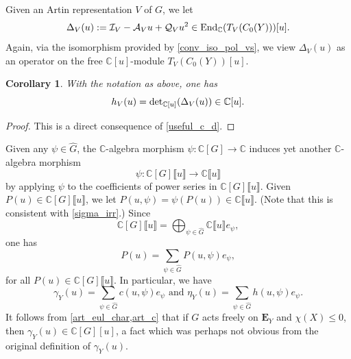 \documentclass[11pt]{amsart}
\newtheorem{corollary}[theorem]{Corollary}
\numberwithin{equation}{section}
\theoremstyle{remark}
\theoremstyle{definition}
\newtheorem{example}[theorem]{Example}
\begin{document}
Given an Artin representation $V$ of $G$, we let
$$\Delta_{V}(u) := \mathcal{I}_{V} - \mathcal{A}_{V}u + \mathcal{Q}_{V}u^{2} \in {\rm End}_{\mathbb{C}}(T_{V}(C_{0}(Y)))[u]. $$
Again, via the isomorphism provided by \cref{conv_iso_pol_vs}, we view $\Delta_{V}(u)$ as an operator on the free $\mathbb{C}[u]$-module $T_{V}(C_{0}(Y))[u]$.
\begin{corollary} \label{3_term}
With the notation as above, one has
$$h_{V}(u) = {\rm det}_{\mathbb{C}[u]}(\Delta_{V}(u)) \in \mathbb{C}[u]. $$
\end{corollary}
\begin{proof}
This is a direct consequence of \cref{useful_c_d}.
\end{proof}

Given any $\psi \in \widehat{G}$, the $\mathbb{C}$-algebra morphism $\psi:\mathbb{C}[G] \rightarrow \mathbb{C}$ induces yet another $\mathbb{C}$-algebra morphism
$$\psi:\mathbb{C}[G]\llbracket u \rrbracket \rightarrow  \mathbb{C}\llbracket u \rrbracket $$
by applying $\psi$ to the coefficients of power series in $\mathbb{C}[G]\llbracket u \rrbracket$.  Given $P(u) \in \mathbb{C}[G]\llbracket u \rrbracket$, we let $P(u,\psi) = \psi(P(u)) \in \mathbb{C}\llbracket u \rrbracket$.  (Note that this is consistent with \cref{sigma_irr}.)  Since
$$\mathbb{C}[G]\llbracket u \rrbracket = \bigoplus_{\psi \in \widehat{G}}\mathbb{C}\llbracket u \rrbracket e_{\psi}, $$
one has
$$P(u) = \sum_{\psi \in \widehat{G}} P(u,\psi) e_{\psi}, $$
for all $P(u) \in \mathbb{C}[G]\llbracket u \rrbracket$.  In particular, we have
$$ \gamma_{Y}(u) = \sum_{\psi \in \widehat{G}}c(u,\psi) e_{\psi} \text{ and } \eta_{Y}(u) = \sum_{\psi \in \widehat{G}}h(u,\psi) e_{\psi}.$$
It follows from \cref{art_eul_char,art_c} that if $G$ acts freely on $\mathbf{E}_{Y}$ and $\chi(X) \le 0$, then $\gamma_{Y}(u) \in \mathbb{C}[G][u]$, a fact which was perhaps not obvious from the original definition of $\gamma_{Y}(u)$.

\end{document}
